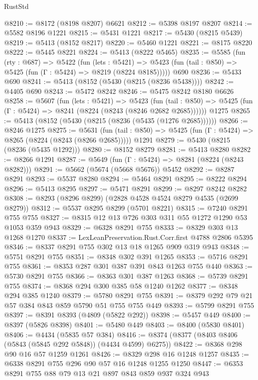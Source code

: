 \begin{lexlean}{RustStd}
\begin{coremodule}
@8210 := @8172 (@8198 @8207) @6621
@8212 := @5398 @8197 @8207
@8214 := @5582 @8196 @1221
@8215 := @5431 @1221
@8217 := @5430 (@8215 @5439)
@8219 := @5413 (@8152 @8217)
@8220 := @5460 @1221
@8221 := @8175 @8220
@8222 := @5445 @8221
@8224 := @5413 (@8222 @5465)
@8235 := @5585
    (fun (rty : @687) =>
    @5422
      (fun (lets : @5421) =>
      @5423 (fun (tail : @850) => @5425 (fun (Γ : @5424) => @8219 (@8224 @8185)))))
    @690
@8236 := @5433 @690
@8241 := @5413 (@8152 (@5430 (@8215 (@8236 @5438))))
@8242 := @4405 @690
@8243 := @5472 @8242
@8246 := @5475 @8242 @8180 @6626
@8258 := @5607
    (fun (lets : @5421) =>
    @5423
      (fun (tail : @850) => @5425 (fun (Γ : @5424) => @8241 (@8224 (@8243 (@8246 @2682 @2685))))))
    @1275
@8265 := @5413 (@8152 (@5430 (@8215 (@8236 (@5435 (@1276 @2685))))))
@8266 := @8246 @1275
@8275 := @5631
    (fun (tail : @850) => @5425 (fun (Γ : @5424) => @8265 (@8224 (@8243 (@8266 @2685)))))
    @1291
@8279 := @5430 (@8215 (@8236 (@5435 @1292)))
@8280 := @8152 @8279
@8281 := @5413 @8280
@8282 := @8266 @1291
@8287 := @5649 (fun (Γ : @5424) => @8281 (@8224 (@8243 @8282)))
@8291 := @5662 (@5674 (@5668 @5676)) @5452
@8292 := @8287 @8291
@8293 := @5537 @8280
@8294 := @5464 @8291
@8295 := @8222 @8294
@8296 := @5413 @8295
@8297 := @5471 @8291
@8299 := @8297 @8242 @8282
@8308 := @8293 (@8296 @8299) (@2828 @4528 @4524 @8279 @4535 (@2699 @8279))
@8312 := @5537 @8295 @8299 (@5701 @8221)
@8315 := @7240 @8291 @755 @755
@8327 := @8315 @12 @13 @726 @303 @311 @55 @1272 @1290 @53 @1053 @359 @943
@8329 := @6328 @8291 @755
@8333 := @8329 @303 @13 @1268 @1270
@8337 := LexLeanPreservation.Rust.Corr.first @4788 @2806 @5395
@8346 := @8337 @8291 @755 @302 @13 @18 @1265 @909 @319 @943
@8348 := @5751 @8291 @755
@8351 := @8348 @302 @391 @1265
@8353 := @5716 @8291 @755
@8361 := @8353 @287 @301 @387 @391 @843 @1263 @755 @440
@8363 := @5730 @8291 @755
@8366 := @8363 @301 @387 @1263
@8368 := @5739 @8291 @755
@8374 := @8368 @294 @300 @385 @58 @1240 @1262
@8377 := @8348 @294 @385 @1240
@8379 := @5780 @8291 @755
@8391 := @8379 @292 @79 @21 @57 @384 @843 @859 @5790 @51 @755 @755 @449
@8393 := @5799 @8291 @755
@8397 := @8391 @8393 (@4809 (@5822 @292))
@8398 := @5457 @449
@8400 := @8397 (@5826 @8398)
@8401 := @5480 @449
@8403 := @8400 (@5830 @8401)
@8406 := @4434 (@5835 @57 @384)
@8416 := @8374 (@8377 (@8403 @8406 (@5843 (@5845 @292 @5848)) (@4434 @4599) @6275))
@8422 := @8368 @298 @90 @16 @57 @1259 @1261
@8426 := @8329 @298 @16 @1248 @1257
@8435 := @6338 @8291 @755 @296 @90 @57 @16 @1248 @1255 @1250
@8447 := @6353 @8291 @755 @88 @79 @13 @21 @897 @843 @859 @937 @324 @943

\end{coremodule}
\end{lexlean}
